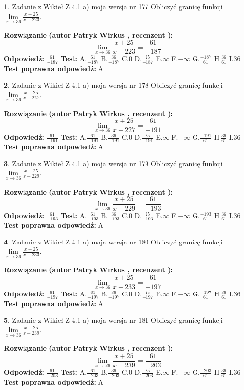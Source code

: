 \documentclass[12pt, a4paper]{article}
\theoremstyle{definition} %
\newtheorem{zad}{}
\newcommand{\zadStart}[1]{\begin{zad}#1\newline}
\newcommand{\zadStop}{\end{zad}}
\newcommand{\rozwStart}[2]{\noindent \textbf{Rozwiązanie (autor #1 , recenzent #2): }\newline}
\newcommand{\rozwStop}{\newline}
\newcommand{\odpStart}{\noindent \textbf{Odpowiedź:}\newline}
\newcommand{\odpStop}{\newline}
\newcommand{\testStart}{\noindent \textbf{Test:}\newline}
\newcommand{\testStop}{\newline}
\newcommand{\kluczStart}{\noindent \textbf{Test poprawna odpowiedź:}\newline}
\newcommand{\kluczStop}{\newline}
\begin{document}
\zadStart{Zadanie z Wikieł Z 4.1 a) moja wersja nr 177}
Obliczyć granicę funkcji $\lim\limits_{x\to36}\frac{x+25}{x-223}$.
\zadStop
\rozwStart{Patryk Wirkus}{}
$$\lim\limits_{x\to36}\frac{x+25}{x-223} = \frac{61}{-187}$$
\rozwStop
\odpStart
$\frac{61}{-187}$
\odpStop
\testStart
A.$\frac{61}{-187}$
B.$\frac{36}{-187}$
C.$0$
D.$\frac{25}{-187}$
E.$\infty$
F.$-\infty$
G.$\frac{-187}{61}$
H.$\frac{36}{61}$
I.$36$
\testStop
\kluczStart
A
\kluczStop



\zadStart{Zadanie z Wikieł Z 4.1 a) moja wersja nr 178}
Obliczyć granicę funkcji $\lim\limits_{x\to36}\frac{x+25}{x-227}$.
\zadStop
\rozwStart{Patryk Wirkus}{}
$$\lim\limits_{x\to36}\frac{x+25}{x-227} = \frac{61}{-191}$$
\rozwStop
\odpStart
$\frac{61}{-191}$
\odpStop
\testStart
A.$\frac{61}{-191}$
B.$\frac{36}{-191}$
C.$0$
D.$\frac{25}{-191}$
E.$\infty$
F.$-\infty$
G.$\frac{-191}{61}$
H.$\frac{36}{61}$
I.$36$
\testStop
\kluczStart
A
\kluczStop



\zadStart{Zadanie z Wikieł Z 4.1 a) moja wersja nr 179}
Obliczyć granicę funkcji $\lim\limits_{x\to36}\frac{x+25}{x-229}$.
\zadStop
\rozwStart{Patryk Wirkus}{}
$$\lim\limits_{x\to36}\frac{x+25}{x-229} = \frac{61}{-193}$$
\rozwStop
\odpStart
$\frac{61}{-193}$
\odpStop
\testStart
A.$\frac{61}{-193}$
B.$\frac{36}{-193}$
C.$0$
D.$\frac{25}{-193}$
E.$\infty$
F.$-\infty$
G.$\frac{-193}{61}$
H.$\frac{36}{61}$
I.$36$
\testStop
\kluczStart
A
\kluczStop



\zadStart{Zadanie z Wikieł Z 4.1 a) moja wersja nr 180}
Obliczyć granicę funkcji $\lim\limits_{x\to36}\frac{x+25}{x-233}$.
\zadStop
\rozwStart{Patryk Wirkus}{}
$$\lim\limits_{x\to36}\frac{x+25}{x-233} = \frac{61}{-197}$$
\rozwStop
\odpStart
$\frac{61}{-197}$
\odpStop
\testStart
A.$\frac{61}{-197}$
B.$\frac{36}{-197}$
C.$0$
D.$\frac{25}{-197}$
E.$\infty$
F.$-\infty$
G.$\frac{-197}{61}$
H.$\frac{36}{61}$
I.$36$
\testStop
\kluczStart
A
\kluczStop



\zadStart{Zadanie z Wikieł Z 4.1 a) moja wersja nr 181}
Obliczyć granicę funkcji $\lim\limits_{x\to36}\frac{x+25}{x-239}$.
\zadStop
\rozwStart{Patryk Wirkus}{}
$$\lim\limits_{x\to36}\frac{x+25}{x-239} = \frac{61}{-203}$$
\rozwStop
\odpStart
$\frac{61}{-203}$
\odpStop
\testStart
A.$\frac{61}{-203}$
B.$\frac{36}{-203}$
C.$0$
D.$\frac{25}{-203}$
E.$\infty$
F.$-\infty$
G.$\frac{-203}{61}$
H.$\frac{36}{61}$
I.$36$
\testStop
\kluczStart
A
\kluczStop
\end{document}
